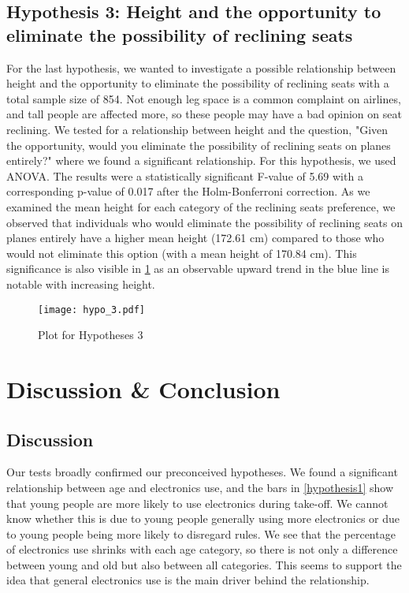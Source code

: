 \documentclass{article}
\theoremstyle{plain}
\theoremstyle{definition}
\theoremstyle{remark}
\begin{document}
\subsection{Hypothesis 3: Height and the opportunity to eliminate the possibility of reclining seats}
For the last hypothesis, we wanted to investigate a possible relationship between height and the opportunity to eliminate the possibility of reclining seats with a total sample size of 854. Not enough leg space is a common complaint on airlines, and tall people are affected more, so these people may have a bad opinion on seat reclining. We tested for a relationship between height and the question, "Given the opportunity, would you eliminate the possibility of reclining seats on planes entirely?" where we found a significant relationship. For this hypothesis, we used ANOVA. The results were a statistically significant F-value of 5.69 with a corresponding p-value of 0.017 after the Holm-Bonferroni correction. As we examined the mean height for each category of the reclining seats preference, we observed that individuals who would eliminate the possibility of reclining seats on planes entirely have a higher mean height (172.61 cm) compared to those who would not eliminate this option (with a mean height of 170.84 cm). This significance is also visible in \ref{hypothesis3} as an observable upward trend in the blue line is notable with increasing height.
\begin{figure}[h]
    \texttt{[image: hypo\_3.pdf]}
    \caption{Plot for Hypotheses 3}
    \label{hypothesis3}
\end{figure}



\section{Discussion \& Conclusion}\label{sec:conclusion}

\subsection{Discussion}
Our tests broadly confirmed our preconceived hypotheses. We found a significant relationship between age and electronics use, and the bars in \ref{hypothesis1} show that young people are more likely to use electronics during take-off. We cannot know whether this is due to young people generally using more electronics or due to young people being more likely to disregard rules. We see that the percentage of electronics use shrinks with each age category, so there is not only a difference between young and old but also between all categories. This seems to support the idea that general electronics use is the main driver behind the relationship. 
\end{document}
